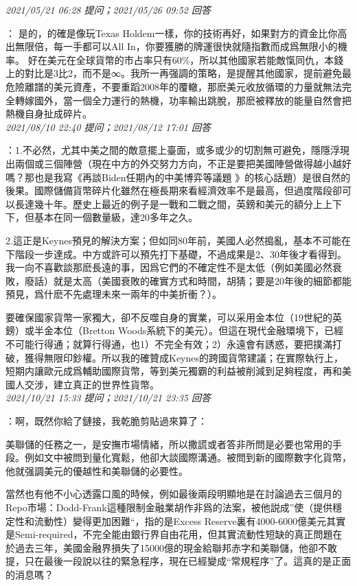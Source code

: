 \documentclass[twocolumn]{ctexart}
\begin{document}
\textit{\hfill\noindent\small 2021/05/21 06:28 提问；2021/05/26 09:52 回答}

：
是的，的確是像玩Texas Holdem一樣，你的技術再好，如果對方的資金比你高出無限倍，每一手都可以All In，你要獲勝的牌運很快就隨指數而成爲無限小的機率。
好在美元在全球貨幣的市占率只有60\%，所以其他國家若能敵愾同仇，本錢上的對比是3比2，而不是∞。我所一再强調的策略，是提醒其他國家，提前避免最危險離譜的美元資產，不要重蹈2008年的覆轍，那麽美元收放循環的力量就無法完全轉嫁國外，當一個全力運行的熱機，功率輸出跳脫，那麽被釋放的能量自然會把熱機自身扯成碎片。
\\

\textit{\hfill\noindent\small 2021/08/10 22:40 提问；2021/08/12 17:01 回答}

：1.不必然，尤其中美之間的敵意擺上臺面，或多或少的切割無可避免，隱隱浮現出兩個或三個陣營（現在中方的外交努力方向，不正是要把美國陣營做得越小越好嗎？那也是我寫《再談Biden任期內的中美博弈等議題 》的核心話題）是很自然的後果。國際儲備貨幣碎片化雖然在極長期來看經濟效率不是最高，但過度階段卻可以長達幾十年。歷史上最近的例子是一戰和二戰之間，英鎊和美元的額分上上下下，但基本在同一個數量級，達20多年之久。

2.這正是Keynes預見的解決方案；但如同80年前，美國人必然搗亂，基本不可能在下階段一步達成。中方或許可以預先打下基礎，不過成果是2、30年後才看得到。我一向不喜歡談那麽長遠的事，因爲它們的不確定性不是太低（例如美國必然衰敗，廢話）就是太高（美國衰敗的確實方式和時間，胡猜；要是20年後的細節都能預見，爲什麽不先處理未來一兩年的中美折衝？）。


要確保國家貨幣一家獨大，卻不反噬自身的實業，可以采用金本位（19世紀的英鎊）或半金本位（Bretton Woods系統下的美元）。但這在現代金融環境下，已經不可能行得通；就算行得通，也1）不完全有效；2）永遠會有誘惑，要把撲滿打破，獲得無限印鈔權。所以我的確贊成Keynes的跨國貨幣建議；在實際執行上，短期内讓歐元成爲輔助國際貨幣，等到美元獨霸的利益被削減到足夠程度，再和美國人交涉，建立真正的世界性貨幣。
\\

\textit{\hfill\noindent\small 2021/10/21 15:33 提问；2021/10/21 23:35 回答}

：啊，既然你給了鏈接，我乾脆剪貼過來算了：

美聯儲的任務之一，是安撫市場情緒，所以撒謊或者答非所問是必要也常用的手段。例如文中被問到量化寬鬆，他卻大談國際溝通。被問到新的國際數字化貨幣，他就强調美元的優越性和美聯儲的必要性。

當然也有他不小心透露口風的時候，例如最後兩段明顯地是在討論過去三個月的Repo市場：Dodd-Frank這種限制金融業胡作非爲的法案，被他説成”使（提供穩定性和流動性）變得更加困難“，指的是Excess Reserve裏有4000-6000億美元其實是Semi-required，不完全能由銀行界自由花用，但其實流動性短缺的真正問題在於過去三年，美國金融界損失了15000億的現金給聯邦赤字和美聯儲，他卻不敢提，只在最後一段說以往的緊急程序，現在已經變成“常規程序”了。這真的是正面的消息嗎？
\\
\end{document}
